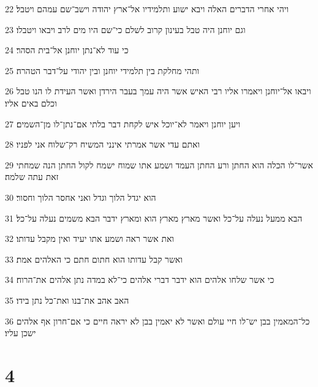 \par 22 ויהי אחרי הדברים האלה ויבא ישוע ותלמידיו אל־ארץ יהודה וישב־שם עמהם ויטבל׃
\par 23 וגם יוחנן היה טבל בעינון קרוב לשלם כי־שם היו מים לרב ויבאו ויטבלו׃
\par 24 כי עוד לא־נתן יוחנן אל־בית הסהר׃
\par 25 ותהי מחלקת בין תלמידי יוחנן ובין יהודי על־דבר הטהרה׃
\par 26 ויבאו אל־יוחנן ויאמרו אליו רבי האיש אשר היה עמך בעבר הירדן ואשר העידת לו הנו טבל וכלם באים אליו׃
\par 27 ויען יוחנן ויאמר לא־יוכל איש לקחת דבר בלתי אם־נתן־לו מן־השמים׃
\par 28 ואתם עדי אשר אמרתי אינני המשיח רק־שלוח אני לפניו׃
\par 29 אשר־לו הכלה הוא החתן ורע החתן העמד ושמע אתו שמוח ישמח לקול החתן הנה שמחתי זאת עתה שלמה׃
\par 30 הוא יגדל הלוך וגדל ואני אחסר הלוך וחסור׃
\par 31 הבא ממעל נעלה על־כל ואשר מארץ מארץ הוא ומארץ ידבר הבא משמים נעלה על־כל׃
\par 32 ואת אשר ראה ושמע אתו יעיד ואין מקבל עדותו׃
\par 33 ואשר קבל עדותו הוא חתום חתם כי האלהים אמת׃
\par 34 כי אשר שלחו אלהים הוא ידבר דברי אלהים כי־לא במדה נתן אלהים את־הרוח׃
\par 35 האב אהב את־בנו ואת־כל נתן בידו׃
\par 36 כל־המאמין בבן יש־לו חיי עולם ואשר לא יאמין בבן לא יראה חיים כי אם־חרון אף אלהים ישכן עליו׃

\chapter{4}

